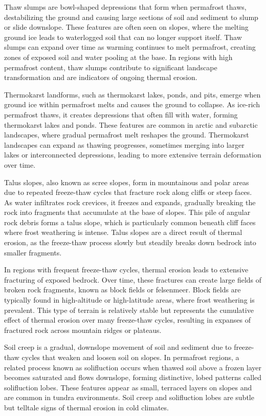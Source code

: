 Thaw slumps are bowl-shaped depressions that form when permafrost thaws, destabilizing the ground and causing large sections of soil and sediment to slump or slide downslope. These features are often seen on slopes, where the melting ground ice leads to waterlogged soil that can no longer support itself. Thaw slumps can expand over time as warming continues to melt permafrost, creating zones of exposed soil and water pooling at the base. In regions with high permafrost content, thaw slumps contribute to significant landscape transformation and are indicators of ongoing thermal erosion.

Thermokarst landforms, such as thermokarst lakes, ponds, and pits, emerge when ground ice within permafrost melts and causes the ground to collapse. As ice-rich permafrost thaws, it creates depressions that often fill with water, forming thermokarst lakes and ponds. These features are common in arctic and subarctic landscapes, where gradual permafrost melt reshapes the ground. Thermokarst landscapes can expand as thawing progresses, sometimes merging into larger lakes or interconnected depressions, leading to more extensive terrain deformation over time.

Talus slopes, also known as scree slopes, form in mountainous and polar areas due to repeated freeze-thaw cycles that fracture rock along cliffs or steep faces. As water infiltrates rock crevices, it freezes and expands, gradually breaking the rock into fragments that accumulate at the base of slopes. This pile of angular rock debris forms a talus slope, which is particularly common beneath cliff faces where frost weathering is intense. Talus slopes are a direct result of thermal erosion, as the freeze-thaw process slowly but steadily breaks down bedrock into smaller fragments.

In regions with frequent freeze-thaw cycles, thermal erosion leads to extensive fracturing of exposed bedrock. Over time, these fractures can create large fields of broken rock fragments, known as block fields or felsenmeer. Block fields are typically found in high-altitude or high-latitude areas, where frost weathering is prevalent. This type of terrain is relatively stable but represents the cumulative effect of thermal erosion over many freeze-thaw cycles, resulting in expanses of fractured rock across mountain ridges or plateaus.

Soil creep is a gradual, downslope movement of soil and sediment due to freeze-thaw cycles that weaken and loosen soil on slopes. In permafrost regions, a related process known as solifluction occurs when thawed soil above a frozen layer becomes saturated and flows downslope, forming distinctive, lobed patterns called solifluction lobes. These features appear as small, terraced layers on slopes and are common in tundra environments. Soil creep and solifluction lobes are subtle but telltale signs of thermal erosion in cold climates.

